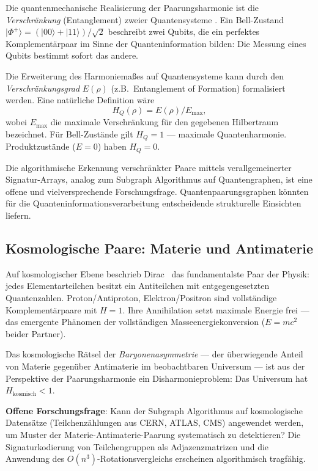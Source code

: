 ﻿\documentclass[a4paper,12pt]{article}
\theoremstyle{definition}
\begin{document}
Die quantenmechanische Realisierung der Paarungsharmonie ist die
\emph{Verschränkung} (Entanglement) zweier Quantensysteme \cite{dirac1930}.
Ein Bell-Zustand $|\Phi^+\rangle = (|00\rangle + |11\rangle)/\sqrt{2}$ beschreibt
zwei Qubits, die ein perfektes Komplementärpaar im Sinne der Quanteninformation
bilden: Die Messung eines Qubits bestimmt sofort das andere.

Die Erweiterung des Harmoniemaßes auf Quantensysteme kann durch den
\emph{Verschränkungsgrad} $E(\rho)$ (z.B.\ Entanglement of Formation) formalisiert
werden. Eine natürliche Definition wäre
\[
	H_Q(\rho) = E(\rho) / E_{\max},
\]
wobei $E_{\max}$ die maximale Verschränkung für den gegebenen Hilbertraum bezeichnet.
Für Bell-Zustände gilt $H_Q = 1$ --- maximale Quantenharmonie. Produktzustände
($E = 0$) haben $H_Q = 0$.

Die algorithmische Erkennung verschränkter Paare mittels verallgemeinerter
Signatur-Arrays, analog zum Subgraph Algorithmus auf Quantengraphen, ist eine
offene und vielversprechende Forschungsfrage. Quantenpaarungsgraphen könnten
für die Quanteninformationsverarbeitung entscheidende strukturelle Einsichten
liefern.

\subsection{Kosmologische Paare: Materie und Antimaterie}

Auf kosmologischer Ebene beschrieb Dirac~\cite{dirac1930} das fundamentalste
Paar der Physik: jedes Elementarteilchen besitzt ein Antiteilchen mit entgegengesetzten
Quantenzahlen. Proton/Antiproton, Elektron/Positron sind vollständige Komplementärpaare
mit $H = 1$. Ihre Annihilation setzt maximale Energie frei --- das emergente Phänomen
der vollständigen Masseenergiekonversion ($E = mc^2$ beider Partner).

Das kosmologische Rätsel der \emph{Baryonenasymmetrie} --- der überwiegende Anteil
von Materie gegenüber Antimaterie im beobachtbaren Universum --- ist aus der
Perspektive der Paarungsharmonie ein Disharmonieproblem: Das Universum hat
$H_{\mathrm{kosmisch}} < 1$.

\textbf{Offene Forschungsfrage}: Kann der Subgraph Algorithmus auf kosmologische
Datensätze (Teilchenzählungen aus CERN, ATLAS, CMS) angewendet werden, um
Muster der Materie-Antimaterie-Paarung systematisch zu detektieren?
Die Signaturkodierung von Teilchengruppen als Adjazenzmatrizen und die
Anwendung des $O(n^3)$-Rotationsvergleichs erscheinen algorithmisch tragfähig.
\end{document}
